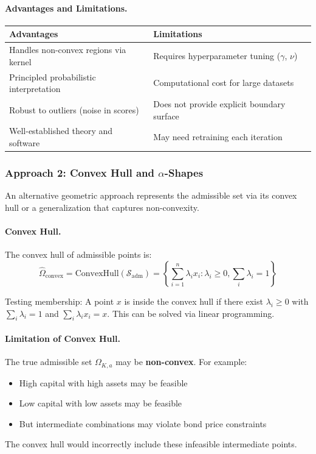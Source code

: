 \paragraph{Advantages and Limitations.}
\begin{center}
\begin{tabular}{p{6cm}p{6cm}}
\toprule
\textbf{Advantages} & \textbf{Limitations} \\
\midrule
Handles non-convex regions via kernel & Requires hyperparameter tuning ($\gamma$, $\nu$) \\
Principled probabilistic interpretation & Computational cost for large datasets \\
Robust to outliers (noise in scores) & Does not provide explicit boundary surface \\
Well-established theory and software & May need retraining each iteration \\
\bottomrule
\end{tabular}
\end{center}


\subsubsection{Approach 2: Convex Hull and $\alpha$-Shapes}

An alternative geometric approach represents the admissible set via its convex hull or a generalization that captures non-convexity.

\paragraph{Convex Hull.}
The convex hull of admissible points is:
\begin{equation}
    \hat{\Omega}_{\text{convex}} = \text{ConvexHull}(\mathcal{S}_{\text{adm}}) = \left\{ \sum_{i=1}^n \lambda_i x_i : \lambda_i \geq 0, \sum_i \lambda_i = 1 \right\}
\end{equation}

Testing membership: A point $x$ is inside the convex hull if there exist $\lambda_i \geq 0$ with $\sum_i \lambda_i = 1$ and $\sum_i \lambda_i x_i = x$. This can be solved via linear programming.

\paragraph{Limitation of Convex Hull.}
The true admissible set $\Omega_{K,a}$ may be \textbf{non-convex}. For example:
\begin{itemize}
    \item High capital with high assets may be feasible
    \item Low capital with low assets may be feasible
    \item But intermediate combinations may violate bond price constraints
\end{itemize}
The convex hull would incorrectly include these infeasible intermediate points.


